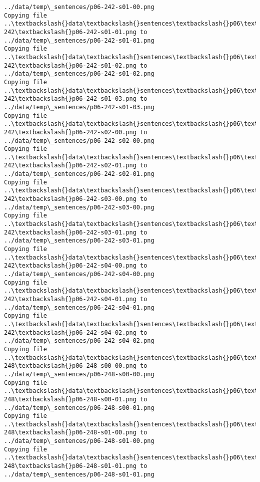 \documentclass[11pt]{article}
\begin{document}
\begin{Verbatim}[commandchars=\\\{\}]
../data/temp\_sentences/p06-242-s01-00.png
Copying file ..\textbackslash{}data\textbackslash{}sentences\textbackslash{}p06\textbackslash{}p06-242\textbackslash{}p06-242-s01-01.png to
../data/temp\_sentences/p06-242-s01-01.png
Copying file ..\textbackslash{}data\textbackslash{}sentences\textbackslash{}p06\textbackslash{}p06-242\textbackslash{}p06-242-s01-02.png to
../data/temp\_sentences/p06-242-s01-02.png
Copying file ..\textbackslash{}data\textbackslash{}sentences\textbackslash{}p06\textbackslash{}p06-242\textbackslash{}p06-242-s01-03.png to
../data/temp\_sentences/p06-242-s01-03.png
Copying file ..\textbackslash{}data\textbackslash{}sentences\textbackslash{}p06\textbackslash{}p06-242\textbackslash{}p06-242-s02-00.png to
../data/temp\_sentences/p06-242-s02-00.png
Copying file ..\textbackslash{}data\textbackslash{}sentences\textbackslash{}p06\textbackslash{}p06-242\textbackslash{}p06-242-s02-01.png to
../data/temp\_sentences/p06-242-s02-01.png
Copying file ..\textbackslash{}data\textbackslash{}sentences\textbackslash{}p06\textbackslash{}p06-242\textbackslash{}p06-242-s03-00.png to
../data/temp\_sentences/p06-242-s03-00.png
Copying file ..\textbackslash{}data\textbackslash{}sentences\textbackslash{}p06\textbackslash{}p06-242\textbackslash{}p06-242-s03-01.png to
../data/temp\_sentences/p06-242-s03-01.png
Copying file ..\textbackslash{}data\textbackslash{}sentences\textbackslash{}p06\textbackslash{}p06-242\textbackslash{}p06-242-s04-00.png to
../data/temp\_sentences/p06-242-s04-00.png
Copying file ..\textbackslash{}data\textbackslash{}sentences\textbackslash{}p06\textbackslash{}p06-242\textbackslash{}p06-242-s04-01.png to
../data/temp\_sentences/p06-242-s04-01.png
Copying file ..\textbackslash{}data\textbackslash{}sentences\textbackslash{}p06\textbackslash{}p06-242\textbackslash{}p06-242-s04-02.png to
../data/temp\_sentences/p06-242-s04-02.png
Copying file ..\textbackslash{}data\textbackslash{}sentences\textbackslash{}p06\textbackslash{}p06-248\textbackslash{}p06-248-s00-00.png to
../data/temp\_sentences/p06-248-s00-00.png
Copying file ..\textbackslash{}data\textbackslash{}sentences\textbackslash{}p06\textbackslash{}p06-248\textbackslash{}p06-248-s00-01.png to
../data/temp\_sentences/p06-248-s00-01.png
Copying file ..\textbackslash{}data\textbackslash{}sentences\textbackslash{}p06\textbackslash{}p06-248\textbackslash{}p06-248-s01-00.png to
../data/temp\_sentences/p06-248-s01-00.png
Copying file ..\textbackslash{}data\textbackslash{}sentences\textbackslash{}p06\textbackslash{}p06-248\textbackslash{}p06-248-s01-01.png to
../data/temp\_sentences/p06-248-s01-01.png

\end{Verbatim}
\end{document}
